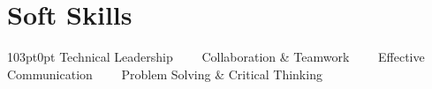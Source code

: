\section{Soft Skills}
\begin{adjustwidth}{103pt}{0pt}
    Technical Leadership \ \ \textbullet \ \ Collaboration \& Teamwork \ \ \textbullet \ \ Effective Communication \ \ \textbullet \ \ Problem Solving \& Critical Thinking
\end{adjustwidth}
